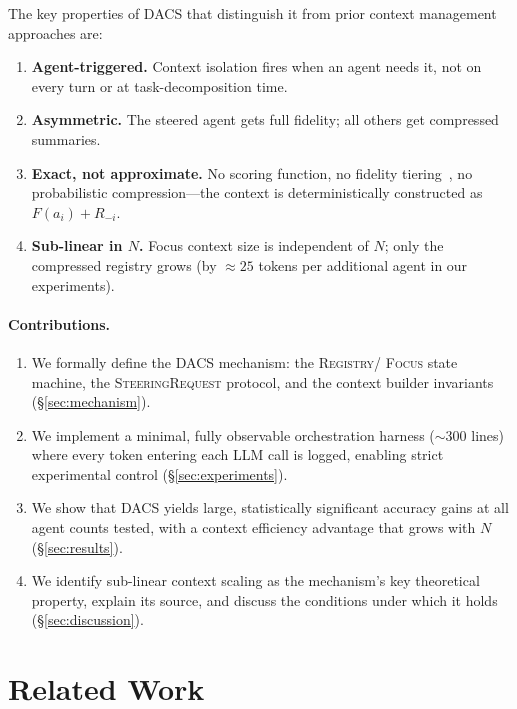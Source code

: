 \documentclass{article}
\begin{document}
The key properties of DACS that distinguish it from prior context
management approaches are:
\begin{enumerate}
  \item \textbf{Agent-triggered.} Context isolation fires when an agent
  needs it, not on every turn or at task-decomposition time.
  \item \textbf{Asymmetric.} The steered agent gets full fidelity;
  all others get compressed summaries.
  \item \textbf{Exact, not approximate.} No scoring function, no fidelity
  tiering~\citep{afm2024,lemon2025}, no probabilistic compression—the
  context is deterministically constructed as $F(a_i) + R_{-i}$.
  \item \textbf{Sub-linear in $N$.} Focus context size is independent of
  $N$; only the compressed registry grows (by $\approx 25$ tokens per
  additional agent in our experiments).
\end{enumerate}

\paragraph{Contributions.}
\begin{enumerate}
  \item We formally define the DACS mechanism: the \textsc{Registry}/
  \textsc{Focus} state machine, the \textsc{SteeringRequest} protocol,
  and the context builder invariants (\S\ref{sec:mechanism}).
  \item We implement a minimal, fully observable orchestration harness
  ($\sim$300 lines) where every token entering each LLM call is logged,
  enabling strict experimental control (\S\ref{sec:experiments}).
  \item We show that DACS yields large, statistically significant accuracy
  gains at all agent counts tested, with a context efficiency advantage
  that grows with $N$ (\S\ref{sec:results}).
  \item We identify sub-linear context scaling as the mechanism's key
  theoretical property, explain its source, and discuss the conditions
  under which it holds (\S\ref{sec:discussion}).
\end{enumerate}

\section{Related Work}
\label{sec:related}
\end{document}
